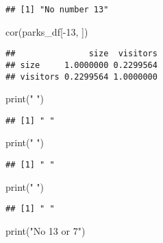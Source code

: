 \documentclass[
]{article}
\newenvironment{Shaded}{\begin{snugshade}}{\end{snugshade}}
\newcommand{\DecValTok}[1]{\textcolor[rgb]{0.00,0.00,0.81}{#1}}
\newcommand{\FunctionTok}[1]{\textcolor[rgb]{0.00,0.00,0.00}{#1}}
\newcommand{\NormalTok}[1]{#1}
\newcommand{\SpecialCharTok}[1]{\textcolor[rgb]{0.00,0.00,0.00}{#1}}
\newcommand{\StringTok}[1]{\textcolor[rgb]{0.31,0.60,0.02}{#1}}
\begin{document}
\begin{verbatim}
## [1] "No number 13"
\end{verbatim}

\begin{Shaded}
\begin{Highlighting}[]
\FunctionTok{cor}\NormalTok{(parks\_df[}\SpecialCharTok{{-}}\DecValTok{13}\NormalTok{, ])}
\end{Highlighting}
\end{Shaded}

\begin{verbatim}
##               size  visitors
## size     1.0000000 0.2299564
## visitors 0.2299564 1.0000000
\end{verbatim}

\begin{Shaded}
\begin{Highlighting}[]
\FunctionTok{print}\NormalTok{(}\StringTok{" "}\NormalTok{)}
\end{Highlighting}
\end{Shaded}

\begin{verbatim}
## [1] " "
\end{verbatim}

\begin{Shaded}
\begin{Highlighting}[]
\FunctionTok{print}\NormalTok{(}\StringTok{" "}\NormalTok{)}
\end{Highlighting}
\end{Shaded}

\begin{verbatim}
## [1] " "
\end{verbatim}

\begin{Shaded}
\begin{Highlighting}[]
\FunctionTok{print}\NormalTok{(}\StringTok{" "}\NormalTok{)}
\end{Highlighting}
\end{Shaded}

\begin{verbatim}
## [1] " "
\end{verbatim}

\begin{Shaded}
\begin{Highlighting}[]
\FunctionTok{print}\NormalTok{(}\StringTok{"No 13 or 7"}\NormalTok{)}
\end{Highlighting}
\end{Shaded}
\end{document}
